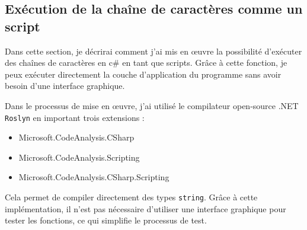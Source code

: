 \newpage
\subsection{Exécution de la chaîne de caractères comme un script}
Dans cette section, je décrirai comment j'ai mis en œuvre la possibilité d'exécuter des chaînes de caractères en c\# en tant que scripts. Grâce à cette fonction, je peux exécuter directement la couche d'application du programme sans avoir besoin d'une interface graphique.

Dans le processus de mise en œuvre, j'ai utilisé le compilateur open-source .NET \texttt{Roslyn} en important trois extensions : 
\begin{itemize}
\item Microsoft.CodeAnalysis.CSharp
\item Microsoft.CodeAnalysis.Scripting
\item Microsoft.CodeAnalysis.CSharp.Scripting
\end{itemize}
Cela permet de compiler directement des types \texttt{string}. 
Grâce à cette implémentation, il n'est pas nécessaire d'utiliser une interface graphique pour tester les fonctions, ce qui simplifie le processus de test.